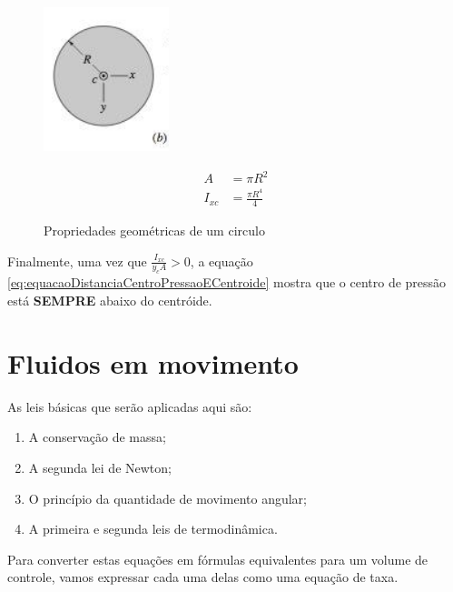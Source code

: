 \documentclass{article}
\begin{document}
\begin{figure}[!h]
  \centering
  \begin{minipage}{0.45\textwidth}
    \centering
    \includegraphics[width=0.7\linewidth]{propriedadesGeometricaCirculo.png}
    \caption{Propriedades geométricas de um circulo}
  \end{minipage}\hfill
  \begin{minipage}{0.45\textwidth}
    \centering
    \begin{align*}
      A&=\pi R^2\\
      I_{xc}&=\frac{\pi R^4}{4}
    \end{align*}
  \end{minipage}
\end{figure}
Finalmente, uma vez que $\frac{I_{xc}}{y_cA}>0$, a equação \ref{eq:equacaoDistanciaCentroPressaoECentroide} mostra que o centro de pressão está \textbf{SEMPRE} abaixo do centróide. 
\newpage
\section{Fluidos em movimento}
As leis básicas que serão aplicadas aqui são:
\begin{enumerate}
  \item A conservação de massa;
  \item A segunda lei de Newton;
  \item O princípio da quantidade de movimento angular;
  \item A primeira e segunda leis de termodinâmica.
\end{enumerate}
Para converter estas equações em fórmulas equivalentes para um volume de controle, vamos expressar cada uma delas como uma equação de taxa.
\end{document}
